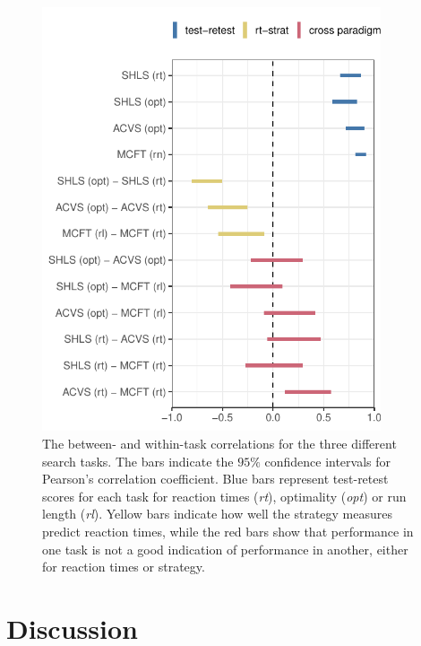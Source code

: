 \documentclass[Afour, sageapa, times]{sagej}
\begin{document}
\begin{figure}
\centering
\includegraphics[width=10cm]{../Scripts/scratch/cor_comparison.pdf}
\caption{The between- and within-task correlations for the three different search tasks. The bars indicate the $95\%$ confidence intervals for Pearson's correlation coefficient. Blue bars represent test-retest scores for each task for reaction times (\textit{rt}), optimality (\textit{opt}) or run length (\textit{rl}). Yellow bars indicate how well the strategy measures predict reaction times, while the red bars show that performance in one task is not a good indication of performance in another, either for reaction times or strategy.}
\label{fig:all_the_cor}
\end{figure}


\section{Discussion}
\end{document}
